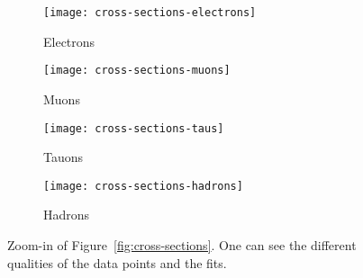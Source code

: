 \begin{figure}
    \centering
    \begin{subfigure}[c]{0.49\linewidth}
        \centering
        \texttt{[image: cross-sections-electrons]}
        \caption{%
            Electrons
        }
        \label{fig:cross-sections-zoom/electrons}
    \end{subfigure}
    \hfill
    \begin{subfigure}[c]{0.49\linewidth}
        \centering
        \texttt{[image: cross-sections-muons]}
        \caption{%
            Muons
        }
        \label{fig:cross-sections-zoom/muons}
    \end{subfigure}

    \vspace{2ex}

    \begin{subfigure}[c]{0.49\linewidth}
        \centering
        \texttt{[image: cross-sections-taus]}
        \caption{%
            Tauons
        }
        \label{fig:cross-sections-zoom/tauons}
    \end{subfigure}
    \hfill
    \begin{subfigure}[c]{0.49\linewidth}
        \centering
        \texttt{[image: cross-sections-hadrons]}
        \caption{%
            Hadrons
        }
        \label{fig:cross-sections-zoom/hadrons}
    \end{subfigure}

    \caption{%
        Zoom-in of Figure~\ref{fig:cross-sections}. One can see the different
        qualities of the data points and the fits.
    }
    \label{fig:cross-sections-zoom}
\end{figure}
